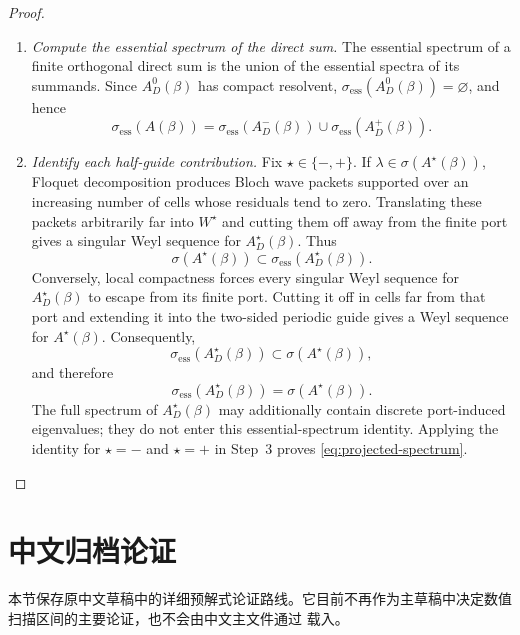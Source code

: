 \begin{proof}
\begin{enumerate}[label=\textit{Step \arabic*.},leftmargin=*,start=2]
\item \emph{Compute the essential spectrum of the direct sum.}
The essential spectrum of a finite orthogonal direct sum is the union of the
essential spectra of its summands.  Since $A_D^0(\beta)$ has compact
resolvent, $\sigma_{\mathrm{ess}}(A_D^0(\beta))=\varnothing$, and hence
\[
  \sigma_{\mathrm{ess}}(A(\beta))
  =\sigma_{\mathrm{ess}}(A_D^-(\beta))
   \cup\sigma_{\mathrm{ess}}(A_D^+(\beta)).
\]

\item \emph{Identify each half-guide contribution.}
Fix $\star\in\{-,+\}$.  If
$\lambda\in\sigma(A^\star(\beta))$, Floquet decomposition produces Bloch
wave packets supported over an increasing number of cells whose residuals
tend to zero.  Translating these packets arbitrarily far into $W^\star$ and
cutting them off away from the finite port gives a singular Weyl sequence for
$A_D^\star(\beta)$.  Thus
\[
  \sigma(A^\star(\beta))
  \subset\sigma_{\mathrm{ess}}(A_D^\star(\beta)).
\]
Conversely, local compactness forces every singular Weyl sequence for
$A_D^\star(\beta)$ to escape from its finite port.  Cutting it off in cells
far from that port and extending it into the two-sided periodic guide gives a
Weyl sequence for $A^\star(\beta)$.  Consequently,
\[
  \sigma_{\mathrm{ess}}(A_D^\star(\beta))
  \subset\sigma(A^\star(\beta)),
\]
and therefore
\[
  \sigma_{\mathrm{ess}}(A_D^\star(\beta))
  =\sigma(A^\star(\beta)).
\]
The full spectrum of $A_D^\star(\beta)$ may additionally contain discrete
port-induced eigenvalues; they do not enter this essential-spectrum identity.
Applying the identity for $\star=-$ and $\star=+$ in Step~3 proves
\eqref{eq:projected-spectrum}.
\end{enumerate}
\end{proof}

\clearpage
\section*{中文归档论证}

本节保存原中文草稿中的详细预解式论证路线。它目前不再作为主草稿中决定数值扫描区间的主要论证，也不会由中文主文件通过 \verb|| 载入。

